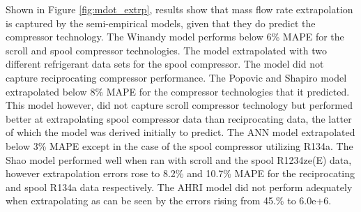 \documentclass[preprint,11pt,authoryear]{elsarticle}
\begin{document}
\begin{table}[h]
\caption{Mass flow rate MAPE's under extrapolation scenarios.}
\label{Tab:extrp_mdot_results}
\begin{center}
\end{center}
\end{table}

Shown in Figure \ref{fig:mdot_extrp}, results show that mass flow rate extrapolation is captured by the semi-empirical models, given that they do predict the compressor technology. The Winandy model performs below 6\% MAPE for the scroll and spool compressor technologies. The model extrapolated with two different refrigerant data sets for the spool compressor. The model did not capture reciprocating compressor performance. The Popovic and Shapiro model extrapolated below 8\% MAPE for the compressor technologies that it predicted. This model however, did not capture scroll compressor technology but performed better at extrapolating spool compressor data than reciprocating data, the latter of which the model was derived initially to predict. The ANN model extrapolated below 3\% MAPE except in the case of the spool compressor utilizing R134a. The Shao model performed well when ran with scroll and the spool R1234ze(E) data, however extrapolation errors rose to 8.2\% and 10.7\% MAPE for the reciprocating and spool R134a data respectively. The AHRI model did not perform adequately when extrapolating as can be seen by the errors rising from 45.\% to 6.0e+6.
\end{document}
